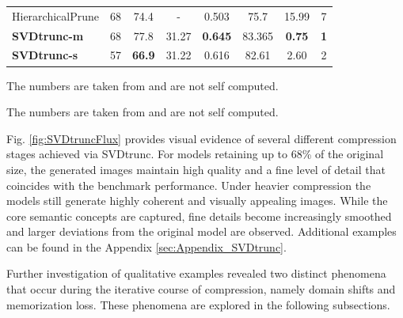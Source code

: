 \begin{table}[H]
\begin{threeparttable}
\begin{tabular}{@{}lccccccc@{}}
			
			HierarchicalPrune\tnote{1} \cite{HierarchicalPrune}  
			& 68
			& 74.4 
			& - 
			& 0.503 
			& 75.7 
			& 15.99
			& 7
			\\ 
			
			
			\textbf{SVDtrunc-m} 
			& 68
			& 77.8 
			& 31.27 
			& \textbf{0.645} 
			& 83.365 
			& \textbf{0.75}
			& \textbf{1}
			\\
			
			
			\textbf{SVDtrunc-s} 
			& 57
			& \textbf{66.9}
			& {31.22} 
			& {0.616} 
			& {82.61} 
			& 2.60
			& 2
			\\ \bottomrule
			
			
		\end{tabular}
		\begin{tablenotes}
			\item[1] \small The numbers are taken from \cite{PPCL} and are not self computed.
			\item[2] \small The numbers are taken from \cite{FastFlux} and are not self computed.
		\end{tablenotes}
	\end{threeparttable}
\end{table}

\vspace{1cm}
Fig. \ref{fig:SVDtruncFlux} provides visual evidence of several different compression stages achieved via \gls{SVD}trunc. For models retaining up to 68\% of the original size, the generated images maintain high quality and a fine level of detail that coincides with the benchmark performance. Under heavier compression the models still generate highly coherent and visually appealing images. While the core semantic concepts are captured, fine details become increasingly smoothed and larger deviations from the original model are observed. Additional examples can be found in the Appendix \ref{sec:Appendix_SVDtrunc}.

Further investigation of qualitative examples revealed two distinct phenomena that occur during the iterative course of compression, namely domain shifts and memorization loss. These phenomena are explored in the following subsections. 


